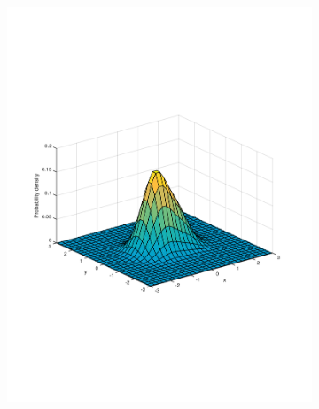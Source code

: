 \documentclass[preprint, 12pt]{elsarticle}
\begin{document}
\begin{figure}[htp!]
	\caption{Example of market where the left subpopulation is twice as large as the right ($n_l/n_r = 2$) and the polarisation of the mean ideal points is respectively $\mu = 0.5$ (left) and $\mu = 1.5$ (right).}
	\centering
	\begin{subfigure}[t]{0.45\textwidth}
		\includegraphics[width=\textwidth, trim={15mm 80mm 20mm 70mm}]{Graphics/distribution_mu05_nratio2.pdf}
		\caption[.]{}
		\label{fig:surface_mu05}
	\end{subfigure}
	~
	\begin{subfigure}[t]{0.45\textwidth}

\end{subfigure}
\end{figure}
\end{document}
